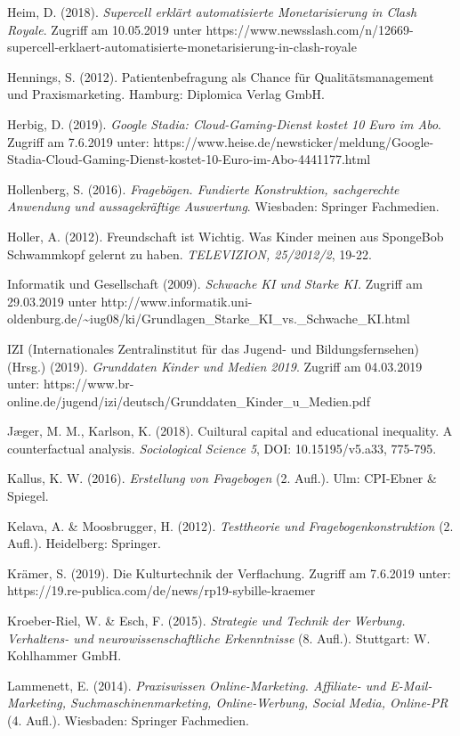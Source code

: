 \documentclass[
  a4paper,
  DIV=11,
  numbers=noendperiod,
  onecolumn,
  oneside,
  a4paper]{scrartcl}
\begin{document}
Heim, D. (2018). \emph{Supercell erklärt automatisierte Monetarisierung
in Clash Royale}. Zugriff am 10.05.2019 unter
https://www.newsslash.com/n/12669-supercell-erklaert-automatisierte-monetarisierung-in-clash-royale

Hennings, S. (2012). Patientenbefragung als Chance für
Qualitätsmanagement und Praxismarketing. Hamburg: Diplomica Verlag GmbH.

Herbig, D. (2019). \emph{Google Stadia: Cloud-Gaming-Dienst kostet 10
Euro im Abo}. Zugriff am 7.6.2019 unter:
https://www.heise.de/newsticker/meldung/Google-Stadia-Cloud-Gaming-Dienst-kostet-10-Euro-im-Abo-4441177.html

Hollenberg, S. (2016). \emph{Fragebögen. Fundierte Konstruktion,
sachgerechte Anwendung und aussagekräftige Auswertung}. Wiesbaden:
Springer Fachmedien.

Holler, A. (2012). Freundschaft ist Wichtig. Was Kinder meinen aus
SpongeBob Schwammkopf gelernt zu haben. \emph{TELEVIZION, 25/2012/2},
19-22.

Informatik und Gesellschaft (2009). \emph{Schwache KI und Starke KI. }
Zugriff am 29.03.2019 unter
http://www.informatik.uni-oldenburg.de/\textasciitilde iug08/ki/Grundlagen\_Starke\_KI\_vs.\_Schwache\_KI.html

IZI (Internationales Zentralinstitut für das Jugend- und
Bildungsfernsehen) (Hrsg.) (2019). \emph{Grunddaten Kinder und Medien
2019}. Zugriff am 04.03.2019 unter:
https://www.br-online.de/jugend/izi/deutsch/Grunddaten\_Kinder\_u\_Medien.pdf

Jæger, M. M., Karlson, K. (2018). Cuiltural capital and educational
inequality. A counterfactual analysis. \emph{Sociological Science 5},
DOI: 10.15195/v5.a33, 775-795.

Kallus, K. W. (2016). \emph{Erstellung von Fragebogen }(2. Aufl.). Ulm:
CPI-Ebner \& Spiegel.

Kelava, A. \& Moosbrugger, H. (2012). \emph{Testtheorie und
Fragebogenkonstruktion }(2. Aufl.). Heidelberg: Springer.

Krämer, S. (2019). Die Kulturtechnik der Verflachung. Zugriff am
7.6.2019 unter: https://19.re-publica.com/de/news/rp19-sybille-kraemer

Kroeber-Riel, W. \& Esch, F. (2015). \emph{Strategie und Technik der
Werbung. Verhaltens- und neurowissenschaftliche Erkenntnisse} (8.
Aufl.). Stuttgart: W. Kohlhammer GmbH.

Lammenett, E. (2014). \emph{Praxiswissen Online-Marketing. Affiliate-
und E-Mail-Marketing, Suchmaschinenmarketing, Online-Werbung, Social
Media, Online-PR} (4. Aufl.). Wiesbaden: Springer Fachmedien.
\end{document}
